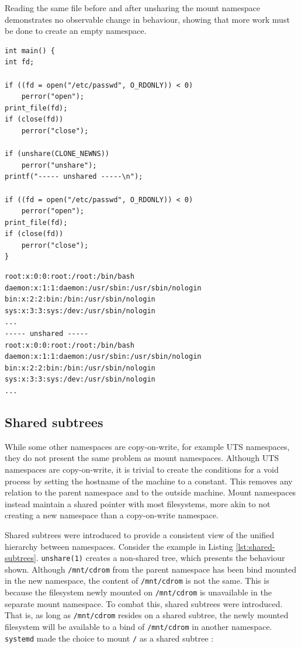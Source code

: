 \documentclass[12pt,a4paper,twoside]{report}
\begin{document}
\begin{listing}
\label{lst:unshare-cat-passwd}
\caption{Reading the same file before and after unsharing the mount namespace demonstrates no observable change in behaviour, showing that more work must be done to create an empty namespace.}

\begin{verbatim}
int main() {
int fd;

if ((fd = open("/etc/passwd", O_RDONLY)) < 0)
    perror("open");
print_file(fd);
if (close(fd))
    perror("close");

if (unshare(CLONE_NEWNS))
    perror("unshare");
printf("----- unshared -----\n");

if ((fd = open("/etc/passwd", O_RDONLY)) < 0)
    perror("open");
print_file(fd);
if (close(fd))
    perror("close");
}
\end{verbatim}
\begin{verbatim}
root:x:0:0:root:/root:/bin/bash
daemon:x:1:1:daemon:/usr/sbin:/usr/sbin/nologin
bin:x:2:2:bin:/bin:/usr/sbin/nologin
sys:x:3:3:sys:/dev:/usr/sbin/nologin
...
----- unshared -----
root:x:0:0:root:/root:/bin/bash
daemon:x:1:1:daemon:/usr/sbin:/usr/sbin/nologin
bin:x:2:2:bin:/bin:/usr/sbin/nologin
sys:x:3:3:sys:/dev:/usr/sbin/nologin
...
\end{verbatim}
\end{listing}

\subsection{Shared subtrees}
\label{sec:voiding-mount-shared-subtrees}

While some other namespaces are copy-on-write, for example UTS namespaces, they do not present the same problem as mount namespaces. Although UTS namespaces are copy-on-write, it is trivial to create the conditions for a void process by setting the hostname of the machine to a constant. This removes any relation to the parent namespace and to the outside machine. Mount namespaces instead maintain a shared pointer with most filesystems, more akin to not creating a new namespace than a copy-on-write namespace.

Shared subtrees \citep{pai_shared_2005} were introduced to provide a consistent view of the unified hierarchy between namespaces. Consider the example in Listing \ref{lst:shared-subtrees}. \texttt{unshare(1)} creates a non-shared tree, which presents the behaviour shown. Although \texttt{/mnt/cdrom} from the parent namespace has been bind mounted in the new namespace, the content of \texttt{/mnt/cdrom} is not the same. This is because the filesystem newly mounted on \texttt{/mnt/cdrom} is unavailable in the separate mount namespace. To combat this, shared subtrees were introduced. That is, as long as \texttt{/mnt/cdrom} resides on a shared subtree, the newly mounted filesystem will be available to a bind of \texttt{/mnt/cdrom} in another namespace. \texttt{systemd} made the choice to mount \texttt{/} as a shared subtree \citep{free_software_foundation_mount_namespaces7_2021}:
\end{document}
